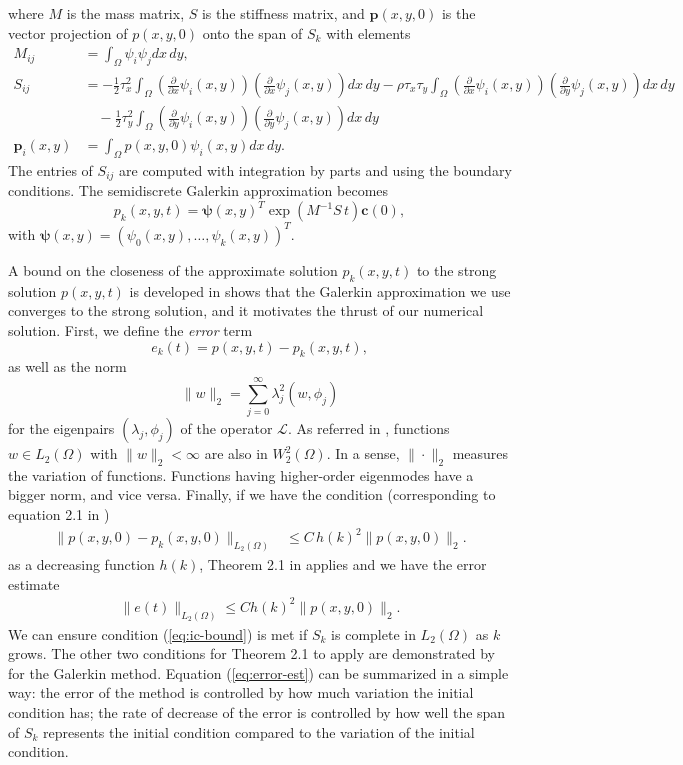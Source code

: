 \documentclass[10pt]{article}
\begin{document}
where $M$ is the mass matrix, $S$ is the stiffness matrix, and
$\mathbf{p}(x,y,0)$ is the vector projection of $p(x,y,0)$ onto the
span of $S_k$ with elements
\begin{align*}
  M_{ij} &= \displaystyle \int_\Omega \psi_i \psi_j dx\,dy, \\
  S_{ij} &= -\frac{1}{2}\tau_x^2 \displaystyle \int_\Omega \left( \frac{\partial}{\partial x} \psi_i(x,y) \right) \left( \frac{\partial}{\partial x} \psi_j(x,y) \right) dx\,dy -\rho\tau_x\tau_y \displaystyle \int_\Omega \left( \frac{\partial}{\partial x} \psi_i(x,y) \right) \left( \frac{\partial}{\partial y} \psi_j(x,y) \right) dx\,dy \\
         &\quad -\frac{1}{2}\tau_y^2 \displaystyle \int_\Omega \left( \frac{\partial}{\partial y} \psi_i(x,y) \right) \left( \frac{\partial}{\partial y} \psi_j(x,y) \right) dx\,dy \\
  \mathbf{p}_i(x,y) &= \displaystyle \int_\Omega p(x,y,0) \psi_i(x,y) dx\,dy.
\end{align*}
The entries of $S_{ij}$ are computed with integration by parts and
using the boundary conditions. The semidiscrete Galerkin approximation
becomes
\[
  p_k(x,y,t) = \boldsymbol{\psi}(x,y)^T \exp\left( M^{-1}S\, t \right) \mathbf{c}(0),
\]
with $\boldsymbol{\psi}(x,y) = (\psi_0(x,y), \ldots, \psi_k(x,y))^T.$

A bound on the closeness of the approximate solution $p_k(x,y,t)$ to
the strong solution $p(x,y,t)$ is developed in \cite{bramble1977some}
shows that the Galerkin approximation we use converges to the strong
solution, and it motivates the thrust of our numerical
solution. First, we define the \textit{error} term
\[
  e_k(t) = p(x,y,t) - p_k(x,y,t),
\]
as well as the norm
\[
  \| w \|_2 = \sum_{j=0}^\infty \lambda_j^2 (w, \phi_j)
\]
for the eigenpairs $(\lambda_j, \phi_j)$ of the operator
$\mathcal{L}$. As referred in \cite{bramble1977some}, functions
$w \in L_2(\Omega)$ with $\|w\|_2 < \infty$ are also in $W_2^2(\Omega)$. In a
sense, $\| \cdot \|_2$ measures the variation of functions. Functions
having higher-order eigenmodes have a bigger norm, and vice
versa. Finally, if we have the condition (corresponding to equation
2.1 in \cite{bramble1977some})
\begin{align}
  \| p(x,y,0) - p_k(x,y,0) \|_{L_2(\Omega)} &\leq C\, h(k)^2 \| p(x,y,0) \|_2. \label{eq:ic-bound}
\end{align}
as a decreasing function $h(k)$, Theorem 2.1 in \cite{bramble1977some}
applies and we have the error estimate
\begin{align}
  \| e(t) \|_{L_2(\Omega)} \leq C h(k)^2 \| p(x,y,0) \|_{2}. \label{eq:error-est}
\end{align}
We can ensure condition (\ref{eq:ic-bound}) is met if $S_k$ is complete
in $L_2(\Omega)$ as $k$ grows. The other two conditions for Theorem
2.1 to apply are demonstrated by \cite{bramble1977some} for the
Galerkin method. Equation (\ref{eq:error-est}) can be summarized in a
simple way: the error of the method is controlled by how much
variation the initial condition has; the rate of decrease of the error
is controlled by how well the span of $S_k$ represents the initial
condition compared to the variation of the initial condition.
\end{document}
